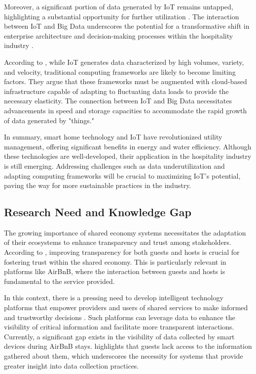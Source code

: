 Moreover, a significant portion of data generated by IoT remains untapped, highlighting a substantial opportunity for 
further utilization \cite{Manyika2015}. The interaction between IoT and Big Data underscores the potential for a 
transformative shift in enterprise architecture and decision-making processes within the hospitality industry 
\cite{Nadkarni2020}.

According to \cite{Zaslavsky2013}, while IoT generates data characterized by high volumes, variety, and velocity, 
traditional computing frameworks are likely to become limiting factors. They argue that these frameworks must be 
augmented with cloud-based infrastructure capable of adapting to fluctuating data loads to provide the necessary 
elasticity. The connection between IoT and Big Data necessitates advancements in speed and storage capacities to 
accommodate the rapid growth of data generated by "things."

In summary, smart home technology and IoT have revolutionized utility management, offering significant benefits in 
energy and water efficiency. Although these technologies are well-developed, their application in the hospitality 
industry is still emerging. Addressing challenges such as data underutilization and adapting computing frameworks will 
be crucial to maximizing IoT's potential, paving the way for more sustainable practices in the industry.

\subsection{Research Need and Knowledge Gap}

The growing importance of shared economy systems necessitates the adaptation of their ecosystems to enhance transparency 
and trust among stakeholders. According to \cite{Deng2021}, improving transparency for both guests and hosts is crucial 
for fostering trust within the shared economy. This is particularly relevant in platforms like AirBnB, where the 
interaction between guests and hosts is fundamental to the service provided.

In this context, there is a pressing need to develop intelligent technology platforms that empower providers and users 
of shared services to make informed and trustworthy decisions \cite{Hamari2016}. Such platforms can leverage data to 
enhance the visibility of critical information and facilitate more transparent interactions. Currently, a significant 
gap exists in the visibility of data collected by smart devices during AirBnB stays. \cite{Mare2020} highlights that 
guests lack access to the information gathered about them, which underscores the necessity for systems that provide 
greater insight into data collection practices.

